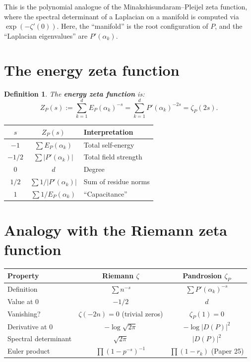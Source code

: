 \documentclass[11pt]{article}
\newtheorem{definition}[theorem]{Definition}
\begin{document}
This is the polynomial analogue of the Minakshisundaram--Pleijel zeta function,
where the spectral determinant of a Laplacian on a manifold is computed via
$\exp(-\zeta'(0))$. Here, the ``manifold'' is the root configuration of $P$,
and the ``Laplacian eigenvalues'' are $P'(\alpha_k)$.

\section{The energy zeta function}

\begin{definition}
The \textbf{energy zeta function} is:
\begin{equation}
Z_P(s) := \sum_{k=1}^{d} E_P(\alpha_k)^{-s}
       = \sum_{k=1}^{d} P'(\alpha_k)^{-2s} = \zeta_P(2s).
\end{equation}
\end{definition}

\begin{center}
\begin{tabular}{ccl}
\toprule
$s$ & $Z_P(s)$ & Interpretation \\
\midrule
$-1$    & $\sum E_P(\alpha_k)$    & Total self-energy \\
$-1/2$  & $\sum |P'(\alpha_k)|$   & Total field strength \\
$0$     & $d$                     & Degree \\
$1/2$   & $\sum 1/|P'(\alpha_k)|$ & Sum of residue norms \\
$1$     & $\sum 1/E_P(\alpha_k)$  & ``Capacitance'' \\
\bottomrule
\end{tabular}
\end{center}

\section{Analogy with the Riemann zeta function}

\begin{center}
\begin{tabular}{lcc}
\toprule
\textbf{Property} & \textbf{Riemann $\zeta$} & \textbf{Pandrosion $\zeta_P$} \\
\midrule
Definition           & $\sum n^{-s}$                  & $\sum P'(\alpha_k)^{-s}$ \\
Value at $0$         & $-1/2$                         & $d$ \\
Vanishing?           & $\zeta(-2n)=0$ (trivial zeros) & $\zeta_P(1) = 0$ \\
Derivative at $0$    & $-\log\sqrt{2\pi}$             & $-\log |D(P)|^2$ \\
Spectral determinant & $\sqrt{2\pi}$                  & $|D(P)|^2$ \\
Euler product        & $\prod (1-p^{-s})^{-1}$        & $\prod (1 - r_k)$ (Paper 25) \\
\bottomrule
\end{tabular}
\end{center}
\end{document}
